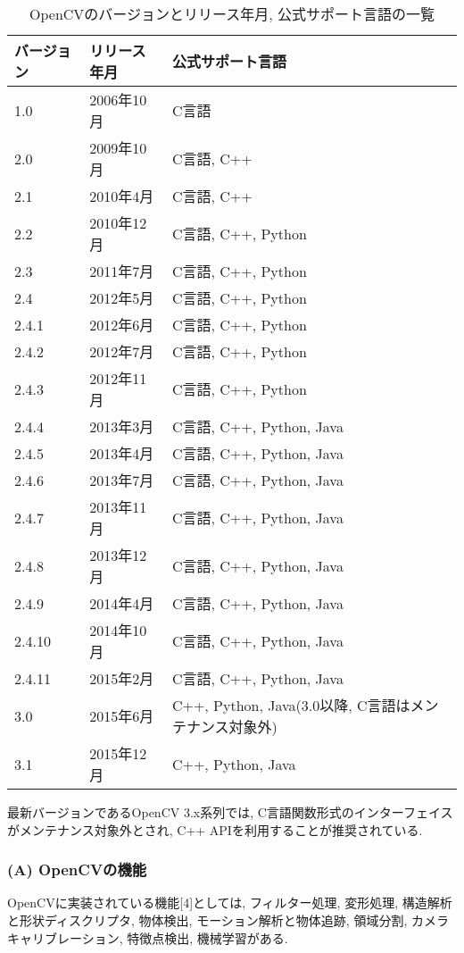 \begin{table}[htb]
\begin{center}
\begin{tabular}{|l|l|l|} \hline
バージョン & リリース年月 & 公式サポート言語 \\ \hline \hline
1.0 & 2006年10月 & C言語 \\ \hline
2.0 & 2009年10月 & C言語, C++ \\ \hline
2.1 & 2010年4月 & C言語, C++ \\ \hline
2.2 & 2010年12月 & C言語, C++, Python \\ \hline
2.3 & 2011年7月 & C言語, C++, Python \\ \hline
2.4 & 2012年5月 & C言語, C++, Python \\ \hline
2.4.1 & 2012年6月 & C言語, C++, Python \\ \hline
2.4.2 & 2012年7月 & C言語, C++, Python \\ \hline
2.4.3 & 2012年11月 & C言語, C++, Python \\ \hline
2.4.4 & 2013年3月 & C言語, C++, Python, Java \\ \hline
2.4.5 & 2013年4月 & C言語, C++, Python, Java \\ \hline
2.4.6 & 2013年7月 & C言語, C++, Python, Java \\ \hline
2.4.7 & 2013年11月 & C言語, C++, Python, Java \\ \hline
2.4.8 & 2013年12月 & C言語, C++, Python, Java \\ \hline
2.4.9 & 2014年4月 & C言語, C++, Python, Java \\ \hline
2.4.10 & 2014年10月 & C言語, C++, Python, Java \\ \hline
2.4.11 & 2015年2月 & C言語, C++, Python, Java \\ \hline
3.0 & 2015年6月 & C++, Python, Java(3.0以降, C言語はメンテナンス対象外) \\ \hline
3.1 & 2015年12月 & C++, Python, Java \\ \hline
\end{tabular}
\caption{OpenCVのバージョンとリリース年月, 公式サポート言語の一覧}
\end{center}
\end{table}

最新バージョンであるOpenCV 3.x系列では, C言語関数形式のインターフェイスがメンテナンス対象外とされ, C++ APIを利用することが推奨されている.

\subsubsection{(A) OpenCVの機能}
OpenCVに実装されている機能[4]としては, フィルター処理, 変形処理, 構造解析と形状ディスクリプタ, 物体検出, モーション解析と物体追跡, 領域分割, カメラキャリブレーション, 特徴点検出, 機械学習がある.

